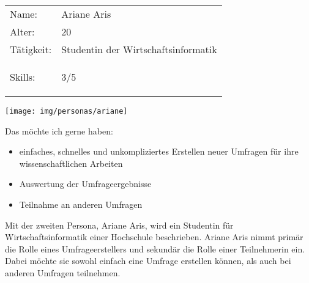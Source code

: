 
%
\newpage
{}
\begin{minipage}[t]{0.5\textwidth}
	\vspace{-3.6cm}
	\renewcommand{\arraystretch}{1.5}
	\begin{tabular}{l l}
		Name: & Ariane Aris \\
		Alter: & 20 \\
		Tätigkeit: & Studentin der Wirtschaftsinformatik \\
		Skills: & 3/5 \hspace{-1cm} \begin{barchart}{5.0}
			\baritemNL{}{3}
		\end{barchart} \\
	\end{tabular}
\end{minipage}
\hfill
\begin{minipage}[t]{0.4\textwidth}
	\flushright
	\texttt{[image: img/personas/ariane]}
\end{minipage}
\autocite{rf-unsplash-studentin}

Das möchte ich gerne haben:
\begin{itemize}
	\item einfaches, schnelles und unkompliziertes Erstellen neuer Umfragen für ihre wissenschaftlichen Arbeiten
	\item Auswertung der Umfrageergebnisse
    \item Teilnahme an anderen Umfragen
\end{itemize}

Mit der zweiten Persona, Ariane Aris, wird ein Studentin für Wirtschaftsinformatik einer Hochschule beschrieben.
Ariane Aris nimmt primär die Rolle eines Umfrageerstellers und sekundär die Rolle einer Teilnehmerin ein.
Dabei möchte sie sowohl einfach eine Umfrage erstellen können, als auch bei anderen Umfragen teilnehmen.